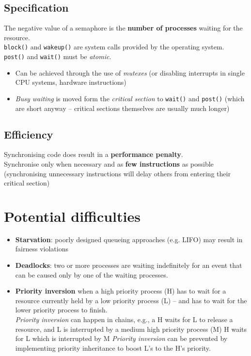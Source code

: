 \documentclass{article}
\begin{document}
\subsection{Specification}
\begin{flushleft}
The negative value of a semaphore is the \textbf{number of processes} waiting for the resource.\\
\texttt{block()} and \texttt{wakeup()} are system calls provided by the operating system.\\
\texttt{post()} and \texttt{wait()} must be \textit{atomic}.
\begin{itemize}
	\item Can be achieved through the use of \textit{mutexes} (or disabling interrupts in single CPU systems, hardware instructions)
	\item \textit{Busy waiting} is moved form the \textit{critical section} to \texttt{wait()} and \texttt{post()} (which are short anyway – critical sections themselves are usually much longer)
\end{itemize}
\end{flushleft}

\subsection{Efficiency}
\begin{flushleft}
Synchronising code does result in a \textbf{performance penalty}.\\
Synchronise only when necessary and as \textbf{few instructions} as possible (synchronising unnecessary instructions will delay others from entering their critical section)
\end{flushleft}

\section{Potential difficulties}
\begin{flushleft}
\begin{itemize}
	\item \textbf{Starvation}: poorly designed queueing approaches (e.g. LIFO) may result in fairness violations 	 
	\item \textbf{Deadlocks}: two or more processes are waiting indefinitely for an event that can be caused only by one of the waiting processes.
	\item \textbf{Priority inversion} when a high priority process (H) has to wait for a resource currently held by a low priority process (L) – and has to wait for the lower priority process to finish.\\
	\setlength\parindent{24pt} \textit{Priority inversion} can happen in chains, e.g., a H waits for L to release a resource, and L is interrupted by a medium high priority process (M) H waits for L which is interrupted by M \textit{Priority inversion} can be prevented by implementing priority inheritance to boost L’s to the H’s priority.\\
\end{itemize}
\end{flushleft}
\end{document}
